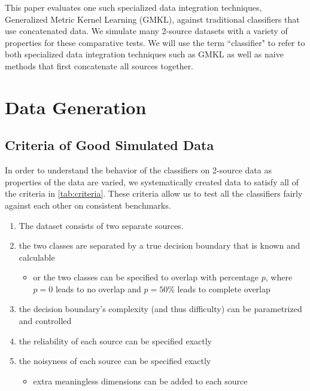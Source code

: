 \documentclass{article}
\begin{document}
This paper evaluates one such specialized data integration techniques,
Generalized Metric Kernel Learning (GMKL), against traditional classifiers that
use concatenated data. We simulate many 2-source datasets with a variety of
properties for these comparative tests. We will use the term ``classifier" to
refer to both specialized data integration techniques such as GMKL as well as
naive methods that first concatenate all sources together.













\section*{Data Generation}



\subsection*{Criteria of Good Simulated Data}

In order to understand the behavior of the classifiers on 2-source data as
properties of the data are varied, we systematically created data to satisfy
all of the criteria in \ref{tab:criteria}. These criteria allow us to test all
the classifiers fairly against each other on consistent benchmarks.

\begin{minipage}{\textwidth}
\centering
\begin{enumerate}
    \item The dataset consists of two separate sources.
    \item \label{itm:separable} the two classes are separated by a true
        decision boundary that is known and calculable
    \begin{itemize}
        \item or the two classes can be specified to overlap with percentage
            $p$, where $p=0$ leads to no overlap and $p=50$\% leads to complete
            overlap
    \end{itemize}
    \item the decision boundary's complexity (and thus difficulty) can be
        parametrized and controlled
    \item the reliability of each source can be specified exactly
    \item the noisyness of each source can be specified exactly
    \begin{itemize}
        \item \label{itm:noise_dims} extra meaningless dimensions can be
            added to each source
    \end{itemize}
\end{enumerate}
\label{tab:criteria}
\end{minipage}
\end{document}
